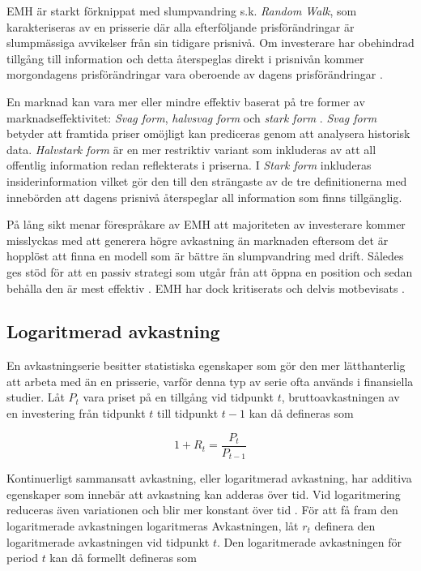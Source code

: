 \documentclass[11pt]{article}
\numberwithin{equation}{section}
\numberwithin{table}{section}
\numberwithin{figure}{section}
\begin{document}
EMH är starkt förknippat med slumpvandring s.k. \emph{Random Walk}, som karakteriseras av en prisserie där alla efterföljande prisförändringar är slumpmässiga avvikelser från sin tidigare prisnivå. Om investerare har obehindrad tillgång till information och detta återspeglas direkt i prisnivån kommer morgondagens prisförändringar vara oberoende av dagens prisförändringar \parencite{EMH}. 

En marknad kan vara mer eller mindre effektiv baserat på tre former av marknadseffektivitet: \emph{Svag form}, \emph{halvsvag form} och \emph{stark form} \parencite{Fama1970}. \emph{Svag form} betyder att framtida priser omöjligt kan prediceras genom att analysera historisk data. \emph{Halvstark form} är en mer restriktiv variant som inkluderas av att all offentlig information redan reflekterats i priserna. I \emph{Stark form} inkluderas insiderinformation vilket gör den till den strängaste av de tre definitionerna med innebörden att dagens prisnivå återspeglar all information som finns tillgänglig.

På lång sikt menar förespråkare av EMH att majoriteten av investerare kommer misslyckas med att generera högre avkastning än marknaden eftersom det är hopplöst att finna en modell som är bättre än slumpvandring med drift. Således ges stöd för att en passiv strategi som utgår från att öppna en position och sedan behålla den är mest effektiv \parencite{EMHforecast}. EMH har dock kritiserats och delvis motbevisats \parencite{basu1977investment, ball1978anomalies}.

\subsection{Logaritmerad avkastning}

En avkastningserie besitter statistiska egenskaper som gör den mer lätthanterlig att arbeta med än en prisserie, varför denna typ av serie ofta används i finansiella studier. Låt $P_{t}$ vara priset på en tillgång vid tidpunkt $t$, bruttoavkastningen av en investering från tidpunkt $t$ till tidpunkt $t-1$ kan då defineras som

\begin{equation}
    1+R_{t} = \frac{P_{t}}{P_{t-1}}
\end{equation}


Kontinuerligt sammansatt avkastning, eller logaritmerad avkastning, har additiva egenskaper som innebär att avkastning kan adderas över tid.  Vid logaritmering reduceras även variationen och blir mer konstant över tid \parencite{tsay}. För att få fram den logaritmerade avkastningen logaritmeras  Avkastningen, låt $r_{t}$ definera den logaritmerade avkastningen vid tidpunkt $t$. Den logaritmerade avkastningen för period $t$ kan då formellt defineras som
\end{document}
